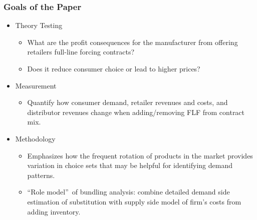 
\begin{frame}
\frametitle{Goals of the Paper}

\begin{itemize}
\item Theory Testing

\begin{itemize}
\item What are the profit consequences for the manufacturer from offering
retailers full-line forcing contracts?

\item Does it reduce consumer choice or lead to higher prices?
\end{itemize}

\item Measurement

\begin{itemize}
\item Quantify how consumer demand, retailer revenues and costs, and
distributor revenues change when adding/removing FLF from contract mix.
\end{itemize}

\item Methodology

\begin{itemize}
\item Emphasizes how the frequent rotation of products in the market
provides variation in choice sets that may be helpful for identifying demand
patterns.

\item \textquotedblleft Role model\textquotedblright \ of bundling analysis:
combine detailed demand side estimation of substitution with supply side
model of firm's costs from adding inventory.
\end{itemize}
\end{itemize}
\end{frame}


